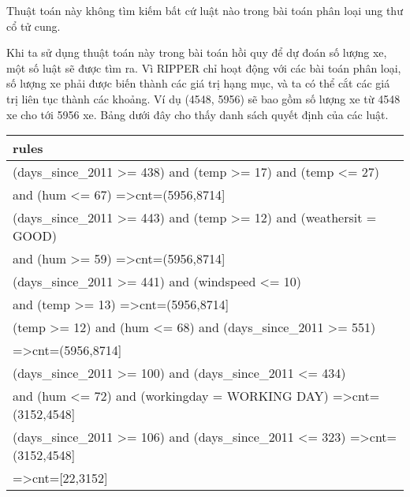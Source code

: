 Thuật toán này không tìm kiếm bất cứ luật nào trong bài toán phân loại ung thư cổ tử cung.

Khi ta sử dụng thuật toán này trong bài toán hồi quy để dự đoán số lượng xe, một số luật sẽ được tìm ra. Vì RIPPER chỉ hoạt động với các bài toán phân loại, số lượng xe phải được biến thành các giá trị hạng mục, và ta có thể cắt các giá trị liên tục thành các khoảng. Ví dụ (4548, 5956) sẽ bao gồm số lượng xe từ 4548 xe cho tới 5956 xe. Bảng dưới đây cho thấy danh sách quyết định của các luật.

\begin{table*}[hbt!]
\centering
\caption{}
\label{tab:my-table}
\begin{tabular}{|l|}
\hline
\textbf{rules}                                                                                                                                                            \\ \hline
(days\_since\_2011 \textgreater{}= 438) and (temp \textgreater{}= 17) and (temp \textless{}= 27) \\ and (hum \textless{}= 67) =\textgreater cnt=(5956,8714{]}                \\ \hline
(days\_since\_2011 \textgreater{}= 443) and (temp \textgreater{}= 12) and (weathersit = GOOD) \\ and (hum \textgreater{}= 59) =\textgreater cnt=(5956,8714{]}                \\ \hline
(days\_since\_2011 \textgreater{}= 441) and (windspeed \textless{}= 10) \\ and (temp \textgreater{}= 13) =\textgreater cnt=(5956,8714{]}                                     \\ \hline
(temp \textgreater{}= 12) and (hum \textless{}= 68) and (days\_since\_2011 \textgreater{}= 551) \\ =\textgreater cnt=(5956,8714{]}                                           \\ \hline
(days\_since\_2011 \textgreater{}= 100) and (days\_since\_2011 \textless{}= 434) \\ and (hum \textless{}= 72) and (workingday = WORKING DAY) =\textgreater cnt=(3152,4548{]} \\ \hline
(days\_since\_2011 \textgreater{}= 106) and (days\_since\_2011 \textless{}= 323) =\textgreater cnt=(3152,4548{]}                                                          \\ \hline
=\textgreater cnt={[}22,3152{]}                                                                                                                                           \\ \hline
\end{tabular}
\end{table*}

